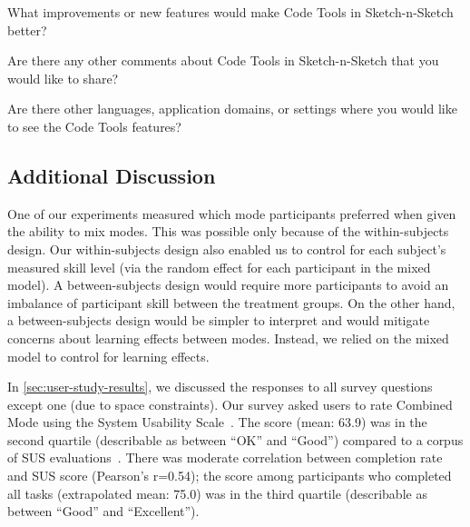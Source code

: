 What improvements or new features would make Code
Tools in Sketch-n-Sketch better?


Are there any other comments about Code Tools in
Sketch-n-Sketch that you would like to share?



Are there other languages, application domains, or
settings where you would like to see the Code Tools
features?


\subsection{Additional Discussion}


One of our experiments measured which mode participants
preferred when given the ability to mix modes. This was
possible only because of the within-subjects design.
%
Our within-subjects design also enabled us to control for
each subject's measured skill level (via the random effect
for each participant in the mixed model). A between-subjects
design would require more participants to avoid an imbalance
of participant skill between the treatment groups.
%
On the other hand, a between-subjects design would be
simpler to interpret and would mitigate concerns about
learning effects between modes. Instead, we relied on the
mixed model to control for learning effects.


In \autoref{sec:user-study-results}, we discussed the responses to
all survey questions except one (due to space constraints).
%
Our survey asked users to rate Combined Mode using the System
Usability Scale~\cite{SUS}. The score (mean: 63.9) was in the second
quartile (describable as between ``OK'' and ``Good'') compared to a corpus of
SUS evaluations~\cite{Bangor2009}. There was moderate correlation between
completion rate and SUS score (Pearson's r=0.54); the score among participants
who completed all tasks (extrapolated mean: 75.0) was in the third
quartile (describable as between ``Good'' and ``Excellent'').

